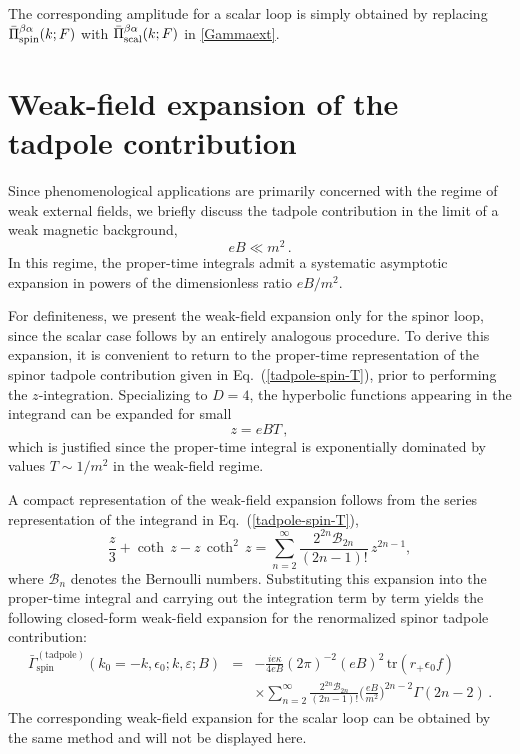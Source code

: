 \documentclass[a4paper,11pt]{article}
\begin{document}
The corresponding amplitude for a scalar loop is simply obtained by replacing $\bar\Pi^{\beta\alpha}_{\rm spin}(k;F)$ with $\bar\Pi^{\beta\alpha}_{\rm scal}(k;F)$ in \eqref{Gammaext}.

\section{Weak-field expansion of the tadpole contribution} 
\label{weak-B}


Since phenomenological applications are primarily concerned with the regime of weak external fields, we briefly discuss the tadpole contribution in the limit of a weak magnetic background,
\begin{equation}
eB \ll m^2 \, .
\end{equation}
In this regime, the proper-time integrals admit a systematic asymptotic expansion in powers of the dimensionless ratio $eB/m^2$.

For definiteness, we present the weak-field expansion only for the spinor loop, since the scalar case follows by an entirely analogous procedure. To derive this expansion, it is convenient to return to the proper-time representation of the spinor tadpole contribution given in Eq.~(\ref{tadpole-spin-T}), prior to performing the $z$-integration. Specializing to $D=4$, the hyperbolic functions appearing in the integrand can be expanded for small
\begin{equation}
z = eBT \, ,
\end{equation}
which is justified since the proper-time integral is exponentially dominated by values $T\sim 1/m^2$ in the weak-field regime.

A compact representation of the weak-field expansion follows from the series representation of the integrand in Eq.~(\ref{tadpole-spin-T}),
\begin{equation}
\frac{z}{3}+{\coth}\, z - z\,{\coth^2}\, z
=
\sum_{n=2}^{\infty}
\frac{2^{2n}\mathcal{B}_{2n}}{(2n-1)!}\,z^{2n-1},
\end{equation}
where $\mathcal{B}_{n}$  denotes the Bernoulli numbers. Substituting this expansion into the proper-time integral and carrying out the integration term by term yields the following closed-form weak-field expansion for the renormalized spinor tadpole contribution:
\begin{eqnarray}
\bar{\Gamma}^{(\text{tadpole})}_{\text{spin}}(k_0=-k,\epsilon_0;k,\varepsilon;B)
&=&
-\frac{ie\kappa}{4eB}(2\pi)^{-2}(eB)^2\,
\text{tr}(r_+\epsilon_0 f)
\nonumber\\
&&\times
\sum_{n=2}^{\infty}
\frac{2^{2n}\mathcal{B}_{2n}}{(2n-1)!}
\Big(\frac{eB}{m^2}\Big)^{2n-2}
\Gamma(2n-2)\,.
\end{eqnarray}
The corresponding weak-field expansion for the scalar loop can be obtained by the same method and will not be displayed here. 
\end{document}

